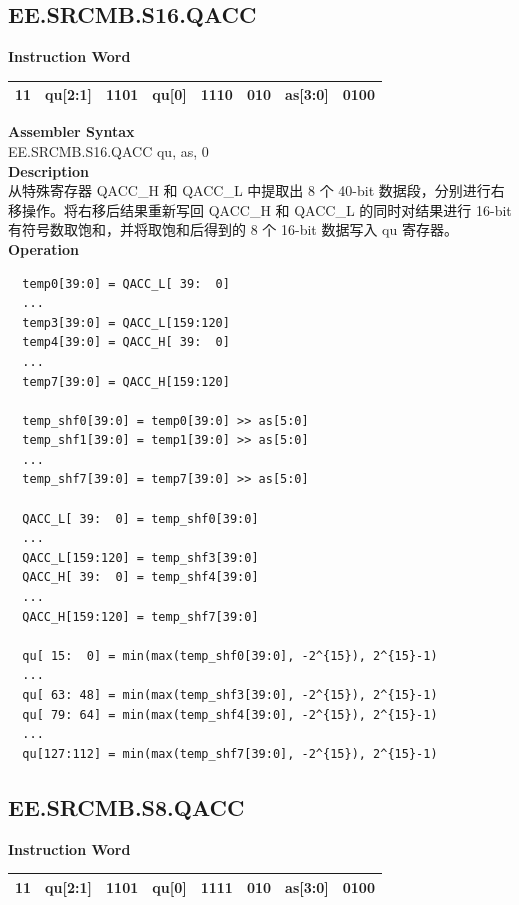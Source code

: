 \clearpage
\subsection{EE.SRCMB.S16.QACC}\label{instruction:EESRCMBS16QACC}
\setlength\tabcolsep{6pt}
\textbf{Instruction Word} \\
\begin{tabular}{|c|c|c|c|c|c|c|c|}
	\hline
	11 & qu[2:1] & 1101 & qu[0] & 1110 & 010 & as[3:0] & 0100 \\
	\hline
\end{tabular}

\textbf{Assembler Syntax} \\
EE.SRCMB.S16.QACC qu, as, 0 \\
\textbf{Description} \\
从特殊寄存器 QACC\_H 和 QACC\_L 中提取出 8 个 40-bit 数据段，分别进行右移操作。将右移后结果重新写回 QACC\_H 和 QACC\_L 的同时对结果进行 16-bit 有符号数取饱和，并将取饱和后得到的 8 个 16-bit 数据写入 qu 寄存器。\\
\textbf{Operation}
\begin{lstlisting}
  temp0[39:0] = QACC_L[ 39:  0]
  ...
  temp3[39:0] = QACC_L[159:120]
  temp4[39:0] = QACC_H[ 39:  0]
  ...
  temp7[39:0] = QACC_H[159:120]

  temp_shf0[39:0] = temp0[39:0] >> as[5:0]
  temp_shf1[39:0] = temp1[39:0] >> as[5:0]
  ...
  temp_shf7[39:0] = temp7[39:0] >> as[5:0]

  QACC_L[ 39:  0] = temp_shf0[39:0]
  ...
  QACC_L[159:120] = temp_shf3[39:0]
  QACC_H[ 39:  0] = temp_shf4[39:0]
  ...
  QACC_H[159:120] = temp_shf7[39:0]

  qu[ 15:  0] = min(max(temp_shf0[39:0], -2^{15}), 2^{15}-1)
  ...
  qu[ 63: 48] = min(max(temp_shf3[39:0], -2^{15}), 2^{15}-1)
  qu[ 79: 64] = min(max(temp_shf4[39:0], -2^{15}), 2^{15}-1)
  ...
  qu[127:112] = min(max(temp_shf7[39:0], -2^{15}), 2^{15}-1)
\end{lstlisting}

\clearpage
\subsection{EE.SRCMB.S8.QACC}\label{instruction:EESRCMBS8QACC}
\setlength\tabcolsep{6pt}
\textbf{Instruction Word} \\
\begin{tabular}{|c|c|c|c|c|c|c|c|}
	\hline
	11 & qu[2:1] & 1101 & qu[0] & 1111 & 010 & as[3:0] & 0100 \\
	\hline
\end{tabular}

